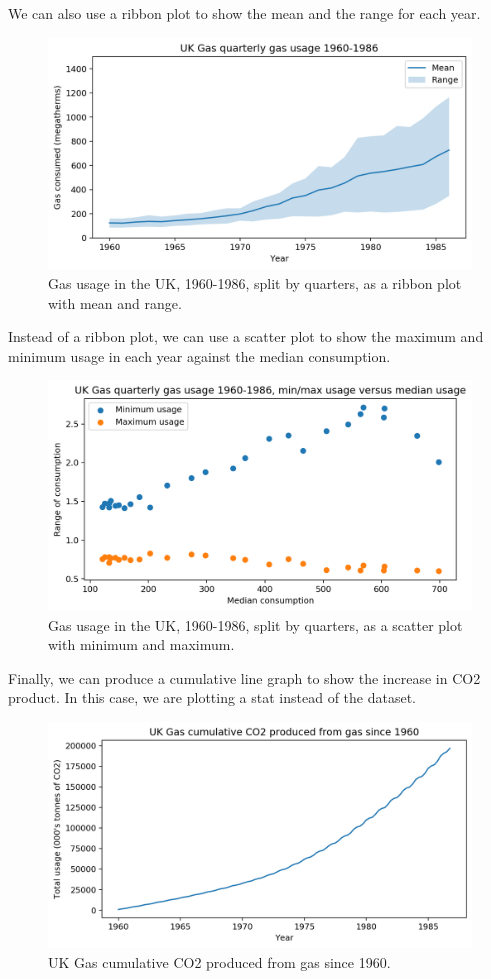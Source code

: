 \documentclass[a4paper, openany]{memoir}
\begin{document}
\noindent We can also use a ribbon plot to show the mean and the range for each year.
\begin{figure}[H]
    \centering
    \includegraphics[scale=0.4]{src/2.21 Gas Example Plot 6.png}
    \caption{Gas usage in the UK, 1960-1986, split by quarters, as a ribbon plot with mean and range.}
\end{figure}
\noindent Instead of a ribbon plot, we can use a scatter plot to show the maximum and minimum usage in each year against the median consumption.
\begin{figure}[H]
    \centering
    \includegraphics[scale=0.4]{src/2.22 Gas Example Plot 7.png}
    \caption{Gas usage in the UK, 1960-1986, split by quarters, as a scatter plot with minimum and maximum.}
\end{figure}
\noindent Finally, we can produce a cumulative line graph to show the increase in CO2 product. In this case, we are plotting a stat instead of the dataset.
\begin{figure}[H]
    \centering
    \includegraphics[scale=0.5]{src/2.23 Gas Example Plot 8.png}
    \caption{UK Gas cumulative CO2 produced from gas since 1960.}
\end{figure}
\newpage
\end{document}
